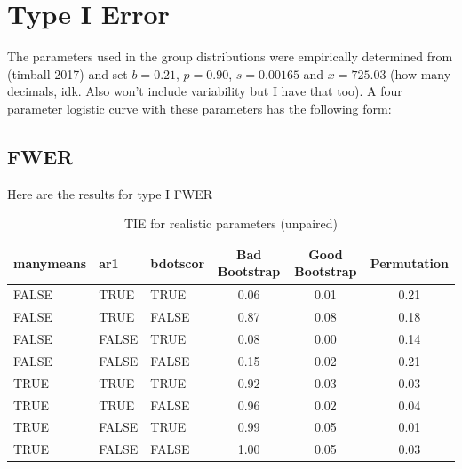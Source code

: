 \documentclass{article}
\begin{document}
\section{Type I Error}

The parameters used in the group distributions were empirically determined from (timball 2017) and set $b = 0.21$, $p = 0.90$, $s = 0.00165$ and $x = 725.03$ (how  many decimals, idk. Also won't include variability but I have that too). A four parameter logistic curve with these parameters has the following form:






\subsection{FWER}

Here are the results for type I FWER

\begin{table}[H]
\centering
\begin{tabular}{lllccc}
  \hline
  manymeans & ar1 & bdotscor &  Bad Bootstrap & Good Bootstrap & Permutation  \\ 
  \hline
FALSE & TRUE & TRUE & 0.06 & 0.01 & 0.21 \\ 
  FALSE & TRUE & FALSE & 0.87 & 0.08 & 0.18 \\ 
  FALSE & FALSE & TRUE & 0.08 & 0.00 & 0.14 \\ 
  FALSE & FALSE & FALSE & 0.15 & 0.02 & 0.21 \\ 
  TRUE & TRUE & TRUE & 0.92 & 0.03 & 0.03 \\ 
  TRUE & TRUE & FALSE & 0.96 & 0.02 & 0.04 \\ 
  TRUE & FALSE & TRUE & 0.99 & 0.05 & 0.01 \\ 
  TRUE & FALSE & FALSE & 1.00 & 0.05 & 0.03 \\  
   \hline
\end{tabular}
\caption{TIE for realistic parameters (unpaired)}
\end{table}
\end{document}
